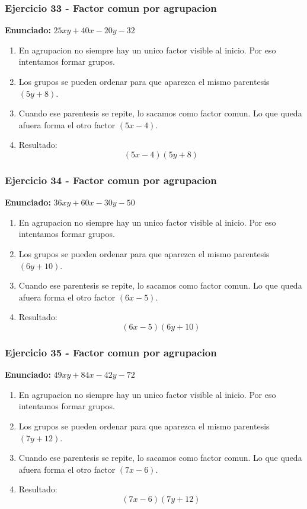 \documentclass[11pt,a4paper]{article}
\begin{document}
\vspace{0.2cm}
\subsubsection*{Ejercicio 33 - Factor comun por agrupacion}
\textbf{Enunciado:} $ 25 x y + 40 x - 20 y - 32 $\par
\begin{enumerate}[leftmargin=2em]
\item En agrupacion no siempre hay un unico factor visible al inicio. Por eso intentamos formar grupos.
\item Los grupos se pueden ordenar para que aparezca el mismo parentesis \((5 y + 8)\).
\item Cuando ese parentesis se repite, lo sacamos como factor comun. Lo que queda afuera forma el otro factor \((5 x - 4)\).
\item Resultado: \[\boxed{\left(5 x - 4\right)\left(5 y + 8\right)}\]
\end{enumerate}

\vspace{0.2cm}
\subsubsection*{Ejercicio 34 - Factor comun por agrupacion}
\textbf{Enunciado:} $ 36 x y + 60 x - 30 y - 50 $\par
\begin{enumerate}[leftmargin=2em]
\item En agrupacion no siempre hay un unico factor visible al inicio. Por eso intentamos formar grupos.
\item Los grupos se pueden ordenar para que aparezca el mismo parentesis \((6 y + 10)\).
\item Cuando ese parentesis se repite, lo sacamos como factor comun. Lo que queda afuera forma el otro factor \((6 x - 5)\).
\item Resultado: \[\boxed{\left(6 x - 5\right)\left(6 y + 10\right)}\]
\end{enumerate}

\vspace{0.2cm}
\subsubsection*{Ejercicio 35 - Factor comun por agrupacion}
\textbf{Enunciado:} $ 49 x y + 84 x - 42 y - 72 $\par
\begin{enumerate}[leftmargin=2em]
\item En agrupacion no siempre hay un unico factor visible al inicio. Por eso intentamos formar grupos.
\item Los grupos se pueden ordenar para que aparezca el mismo parentesis \((7 y + 12)\).
\item Cuando ese parentesis se repite, lo sacamos como factor comun. Lo que queda afuera forma el otro factor \((7 x - 6)\).
\item Resultado: \[\boxed{\left(7 x - 6\right)\left(7 y + 12\right)}\]
\end{enumerate}
\end{document}
